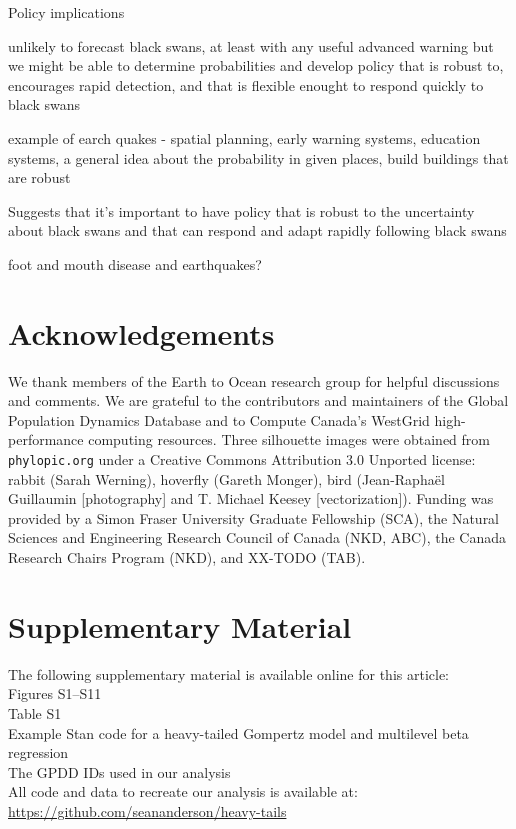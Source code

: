 Policy implications

unlikely to forecast black swans, at least with any useful advanced warning
but we might be able to determine probabilities
and develop policy that is robust to, encourages rapid detection, and that is flexible enought to respond quickly to black swans

example of earch quakes - spatial planning, early warning systems, education systems, a general idea about the probability in given places, build buildings that are robust

Suggests that it's important to have policy that is robust to the uncertainty
about black swans and that can respond and adapt rapidly following black swans

foot and mouth disease and earthquakes?

\section{Acknowledgements}

We thank members of the Earth to Ocean research group for helpful discussions
and comments. We are grateful to the contributors and maintainers of the Global
Population Dynamics Database and to Compute Canada's WestGrid high-performance
computing resources. Three silhouette images were obtained from
\texttt{phylopic.org} under a Creative Commons Attribution 3.0 Unported
license: rabbit (Sarah Werning), hoverfly (Gareth Monger), bird (Jean-Raphaël
Guillaumin {[}photography{]} and T. Michael Keesey {[}vectorization{]}).
Funding was provided by a Simon Fraser University Graduate Fellowship (SCA),
the Natural Sciences and Engineering Research Council of Canada (NKD, ABC), the
Canada Research Chairs Program (NKD), and XX-TODO (TAB).

\section{Supplementary Material}

The following supplementary material is available online for this article:\\
Figures S1--S11\\
Table S1\\
Example Stan code for a heavy-tailed Gompertz model and multilevel beta
regression\\
The GPDD IDs used in our analysis\\
All code and data to recreate our analysis is available at:\\
\url{https://github.com/seananderson/heavy-tails}


